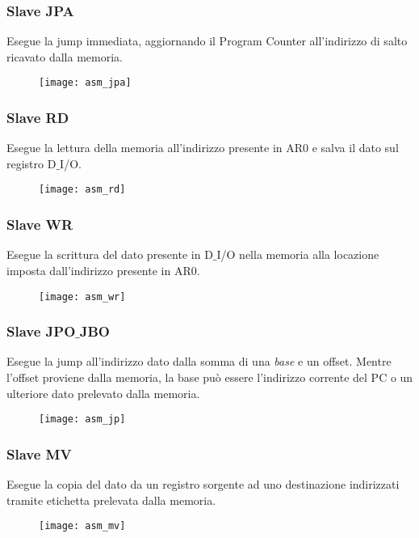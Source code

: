 \newpage
\subsubsection{Slave JPA}
Esegue la jump immediata, aggiornando il Program Counter all'indirizzo di salto ricavato dalla memoria.
\begin{figure}[H]
	\centering
	\texttt{[image: asm\_jpa]}
	\label{fig:asm_jpa}
\end{figure}

\newpage
\subsubsection{Slave RD}
Esegue la lettura della memoria all'indirizzo presente in AR0 e salva il dato sul registro D$\_$I/O.
\begin{figure}[H]
	\centering
	\texttt{[image: asm\_rd]}
	\label{fig:asm_rd}
\end{figure}

\newpage
\subsubsection{Slave WR}
Esegue la scrittura del dato presente in D$\_$I/O nella memoria alla locazione imposta dall'indirizzo presente in AR0.
\begin{figure}[H]
\centering
\texttt{[image: asm\_wr]}
\label{fig:asm_wr}
\end{figure}

\newpage
\subsubsection{Slave JPO$\_$JBO}
Esegue la jump all'indirizzo dato dalla somma di una \textit{base} e un offset. Mentre l'offset proviene dalla memoria, la base può essere l'indirizzo corrente del PC o un ulteriore dato prelevato dalla memoria.
\begin{figure}[H]
	\centering
	\texttt{[image: asm\_jp]}
	\label{fig:asm_jp}
\end{figure}

\newpage
\subsubsection{Slave MV}
Esegue la copia del dato da un registro sorgente ad uno destinazione indirizzati tramite etichetta prelevata dalla memoria.
\begin{figure}[H]
	\centering
	\texttt{[image: asm\_mv]}
	\label{fig:asm_mv}
\end{figure}

